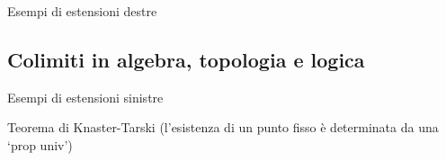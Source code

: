 \begin{example}
\end{example}
\begin{example}
\end{example}
\begin{example}
\end{example}
\begin{example}
\end{example}
\begin{example}
\end{example}
\begin{examples}
	Esempi di estensioni destre
\end{examples}
\subsection{Colimiti in algebra, topologia e logica}
\begin{example}
\end{example}
\begin{example}
	\Todo{}
\end{example}
\begin{example}
\end{example}
\begin{example}
\end{example}
\begin{example}
\end{example}
\begin{example}
\end{example}
\begin{example}
\end{example}
\begin{example}
\end{example}
\begin{example}
\end{example}
\begin{example}
\end{example}
\begin{examples}
	Esempi di estensioni sinistre
\end{examples}
\begin{theorem}
	Teorema di Knaster-Tarski (l'esistenza di un punto fisso è determinata da una `prop univ')
\end{theorem}


